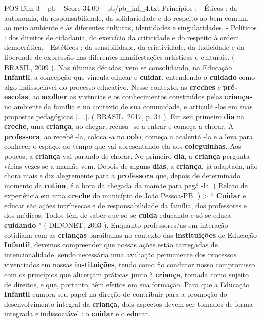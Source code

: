 \begin{textsample}{POS Dim 3 – pb – Score 34.00 – pb/pb\_inf\_4.txt}
Princípios : - Éticos : da autonomia, da responsabilidade, da solidariedade e do respeito ao bem comum, ao meio ambiente e às diferentes culturas, identidades e singularidades. - Políticos : dos direitos de cidadania, do exercício da criticidade e do respeito à ordem democrática. - Estéticos : da sensibilidade, da criatividade, da ludicidade e da liberdade de expressão nas diferentes manifestações artísticas e culturais. ( BRASIL, 2009 ).
Nas últimas décadas, vem se consolidando, na Educação \textbf{Infantil}, a concepção que vincula educar e \textbf{cuidar}, entendendo o \textbf{cuidado} como algo indissociável do processo educativo.
Nesse contexto, as \textbf{creches} e \textbf{pré-escolas}, ao \textbf{acolher} as vivências e os conhecimentos construídos pelas \textbf{crianças} no ambiente da família e no contexto de sua comunidade, e articulá -los em suas propostas pedagógicas [... ]. ( BRASIL, 2017, p. 34 ).
Em seu primeiro \textbf{dia} na \textbf{creche}, uma \textbf{criança}, ao chegar, recusa -se a entrar e começa a chorar.
A \textbf{professora}, ao recebê -la, coloca -a no \textbf{colo}, começa a acalentá -la e a leva para conhecer o espaço, ao tempo que vai apresentando ela aos \textbf{coleguinhas}.
Aos poucos, a \textbf{criança} vai parando de chorar.
No primeiro \textbf{dia}, a \textbf{criança} pergunta várias vezes se a mamãe vem.
Depois de alguns \textbf{dias}, a \textbf{criança}, já adaptada, não chora mais e diz alegremente para a \textbf{professora} que, depois de determinado momento da \textbf{rotina}, é a hora da chegada da mamãe para pegá -la. ( Relato de experiência em uma \textbf{creche} do município de João Pessoa-PB. ) > “ \textbf{Cuidar} e educar são ações intrínsecas e de responsabilidade da família, dos professores e dos médicos.
Todos têm de saber que só se \textbf{cuida} educando e só se educa \textbf{cuidando} ” ( DIDONET, 2003 ).
Enquanto professores/as em interação cotidiana com as \textbf{crianças} paraibanas no contexto das \textbf{instituições} de Educação \textbf{Infantil}, devemos compreender que nossas ações estão carregadas de intencionalidade, sendo necessária uma avaliação permanente dos processos vivenciados em nossas \textbf{instituições}, tendo como fio condutor nosso compromisso com os princípios que alicerçam práticas junto à \textbf{criança}, tomada como sujeito de direitos, e que, portanto, têm efeitos em sua formação.
Para que a Educação \textbf{Infantil} cumpra seu papel na direção de contribuir para a promoção do desenvolvimento integral da \textbf{criança}, dois aspectos devem ser tomados de forma integrada e indissociável : o \textbf{cuidar} e o educar.

\end{textsample}
